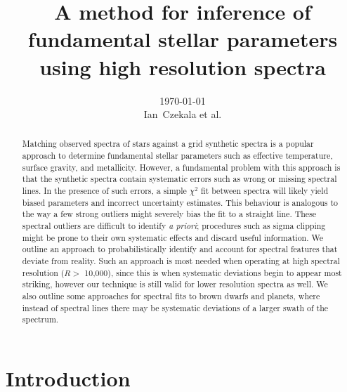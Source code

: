 \documentclass[preprint]{aastex} %
\begin{document}
\title{A method for inference of fundamental stellar parameters using high resolution spectra}
\author{\today{}\\
\medskip
Ian~Czekala et al.
}


\begin{abstract}
  Matching observed spectra of stars against a grid synthetic spectra is a popular approach to determine fundamental stellar parameters such as effective temperature, surface gravity, and metallicity. However, a fundamental problem with this approach is that the synthetic spectra contain systematic errors such as wrong or missing spectral lines. In the presence of such errors, a simple $\chi^2$ fit between spectra will likely yield biased parameters and incorrect uncertainty estimates. This behaviour is analogous to the way a few strong outliers might severely bias the fit to a straight line. These spectral outliers are difficult to identify \emph{a priori}; procedures such as sigma clipping might be prone to their own systematic effects and discard useful information. We outline an approach to probabilistically identify and account for spectral features that deviate from reality. Such an approach is most needed when operating at high spectral resolution ($R >$ 10,000), since this is when systematic deviations begin to appear most striking, however our technique is still valid for lower resolution spectra as well. We also outline some approaches for spectral fits to brown dwarfs and planets, where instead of spectral lines there may be systematic deviations of a larger swath of the spectrum.
\end{abstract}



\section{Introduction}
\end{document}
